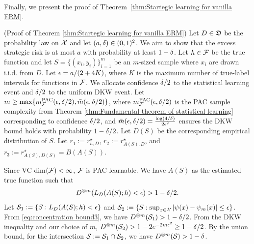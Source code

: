 Finally, we present the proof of Theorem~\ref{thm:Startegic learning for vanilla ERM}.

\begin{apdxproof}(Proof of Theorem \ref{thm:Startegic learning for vanilla ERM})\label{proof:strategic_learning_vanilla_erm}
Let $D \in \mathfrak{D}$ be the probability law on $\mathcal{X}$ and let $(a,\delta) \in (0,1)^2$. We aim to show that the excess strategic risk is at most $a$ with probability at least $1-\delta$. Let $h \in \mathcal{F}$ be the true function and let $S = \{(x_i,y_i)\}_{i=1}^m$ be an $m$-sized sample where $x_i$ are drawn i.i.d. from $D$.
Let $\epsilon = a / (2 + 4K)$, where $K$ is the maximum number of true-label intervals for functions in $\mathcal{F}$. We allocate confidence $\delta/2$ to the statistical learning event and $\delta/2$ to the uniform DKW event.
Let $m \geq \max\{m_{\mathcal{F}}^{\mathrm{PAC}}(\epsilon,\delta/2), \bar{m}(\epsilon,\delta/2)\}$, where $m_{\mathcal{F}}^{\mathrm{PAC}}(\epsilon,\delta/2)$ is the PAC sample complexity from Theorem \ref{thm:Fundamental theorem of statistical learning} corresponding to confidence $\delta/2$, and $\bar{m}(\epsilon,\delta/2) = \frac{\log(4/\delta)}{2\epsilon^2}$ ensures the DKW bound holds with probability $1-\delta/2$.
Let $D(S)$ be the corresponding empirical distribution of $S$.
Let $r_1 := r^\star_{h,D}$, $r_2 := r^\star_{A(S),D}$, and $r_3 := r^\star_{A(S),D(S)} = B(A(S))$.

Since VC dim$(\mathcal{F}) < \infty$, $\mathcal{F}$ is PAC learnable. We have $A(S)$ as the estimated true function such that 
\begin{equation}\label{eq:concentration bound3}
    D^{\otimes m}(L_{D}(A(S);h) < \epsilon) > 1 - \delta/2.
\end{equation}
Let $\mathcal{S}_1 := \{S: L_D(A(S);h) < \epsilon\}$ and $\mathcal{S}_2 := \{S: \sup_{x \in \mathcal{X}}|\psi(x) - \psi_m(x)| \leq \epsilon \}$.
From \eqref{eq:concentration bound3}, we have $D^{\otimes m}(\mathcal{S}_1) > 1-\delta/2$. From the DKW inequality and our choice of $m$, $D^{\otimes m}(\mathcal{S}_2) > 1 - 2e^{-2m\epsilon^2} \geq 1-\delta/2$. By the union bound, for the intersection $\mathcal{S} := \mathcal{S}_1 \cap \mathcal{S}_2$, we have $D^{\otimes m}(\mathcal{S}) > 1-\delta$.


\end{apdxproof}
